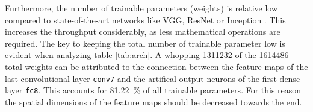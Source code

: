 Furthermore, the number of trainable parameters (weights) is relative low compared to state-of-the-art networks like VGG, ResNet or Inception \cite{}. %
This increases the throughput considerably, as less mathematical operations are required.
The key to keeping the total number of trainable parameter low is evident when analyzing table \ref{tab:arch}.
A whopping \num{1311232} of the \num{1614486} total weights can be attributed to the connection between the feature maps of the last convolutional layer \texttt{conv7} and the artifical output neurons of the first dense layer \texttt{fc8}.
This accounts for \SI{81.22}{\percent} of all trainable parameters.
For this reason the spatial dimensions of the feature maps should be decreased towards the end.

